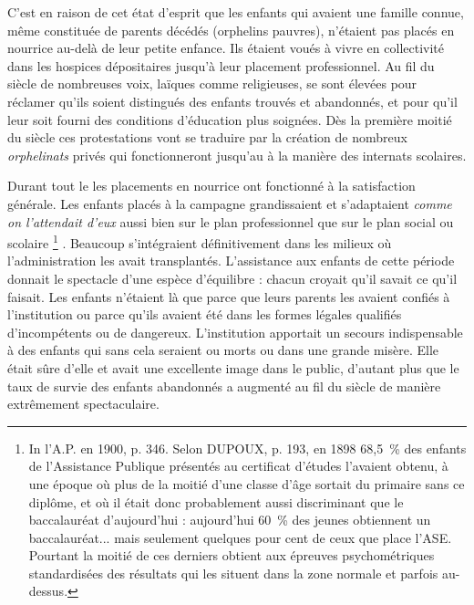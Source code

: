  C'est en raison de cet état d'esprit que les enfants qui avaient une famille connue, même constituée de parents décédés (orphelins pauvres), n'étaient pas placés en nourrice au-delà de leur petite enfance. Ils étaient voués à vivre en collectivité dans les hospices dépositaires jusqu'à leur placement professionnel. Au fil du siècle de nombreuses voix, laïques comme religieuses, se sont élevées pour réclamer qu'ils soient distingués des enfants trouvés et abandonnés, et pour qu'il leur soit fourni des conditions d'éducation plus soignées. Dès la première moitié du siècle ces protestations vont se traduire par la création de nombreux \emph{orphelinats} privés qui fonctionneront jusqu'au  à la manière des internats scolaires. 

 Durant tout le  les placements en nourrice ont fonctionné à la satisfaction générale. Les enfants placés à la campagne grandissaient et s'adaptaient \emph{comme on l'attendait d'eux} aussi bien sur le plan professionnel que sur le plan social ou scolaire%
\footnote{In l'A.P. en 1900, p. 346. Selon DUPOUX, p. 193, en 1898 68,5~\% des enfants de l'Assistance Publique présentés au certificat d'études l'avaient obtenu, à une époque où plus de la moitié d'une classe d'âge sortait du primaire sans ce diplôme, et où il était donc probablement aussi discriminant que le baccalauréat d'aujourd'hui : aujourd'hui 60~\% des jeunes obtiennent un baccalauréat... mais seulement quelques pour cent de ceux que place l'ASE. Pourtant la moitié de ces derniers obtient aux épreuves psychométriques standardisées des résultats qui les situent dans la zone normale et parfois au-dessus.}%
. Beaucoup s'intégraient définitivement dans les milieux où l'administration les avait transplantés. L'assistance aux enfants de cette période donnait le spectacle d'une espèce d'équilibre : chacun croyait qu'il savait ce qu'il faisait. Les enfants n'étaient là que parce que leurs parents les avaient confiés à l'institution ou parce qu'ils avaient été dans les formes légales qualifiés d'incompétents ou de dangereux. L'institution apportait un secours indispensable à des enfants qui sans cela seraient ou morts ou dans une grande misère. Elle était sûre d'elle et avait une excellente image dans le public, d'autant plus que le taux de survie des enfants abandonnés a augmenté au fil du siècle de manière extrêmement spectaculaire.

